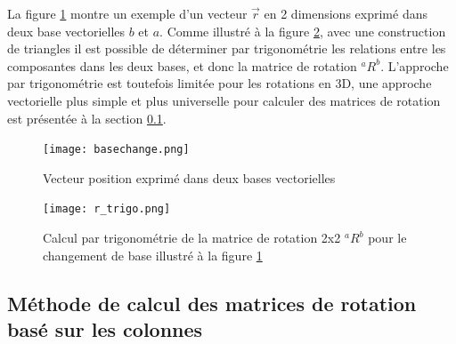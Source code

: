 La figure \ref{fig:basechange2d} montre un exemple d'un vecteur $\vec{r}$ en 2 dimensions exprimé dans deux base vectorielles $b$ et $a$. Comme illustré à la figure \ref{fig:r_trigo}, avec une construction de triangles il est possible de déterminer par trigonométrie les relations entre les composantes dans les deux bases, et donc la matrice de rotation ${}^aR^b$. L'approche par trigonométrie est toutefois limitée pour les rotations en 3D, une approche vectorielle plus simple et plus universelle pour calculer des matrices de rotation est présentée à la section \ref{sec:calmat}.
\begin{figure}[H]
	\centering
		\texttt{[image: basechange.png]}
	\caption{Vecteur position exprimé dans deux bases vectorielles}
	\label{fig:basechange2d}
\end{figure}
\begin{figure}[H]
	\centering
		\texttt{[image: r\_trigo.png]}
	\caption{Calcul par trigonométrie de la matrice de rotation 2x2 ${}^aR^b$ pour le changement de base illustré à la figure \ref{fig:basechange2d}}
	\label{fig:r_trigo}
\end{figure}




\subsection{Méthode de calcul des matrices de rotation basé sur les colonnes}
\label{sec:calmat}

